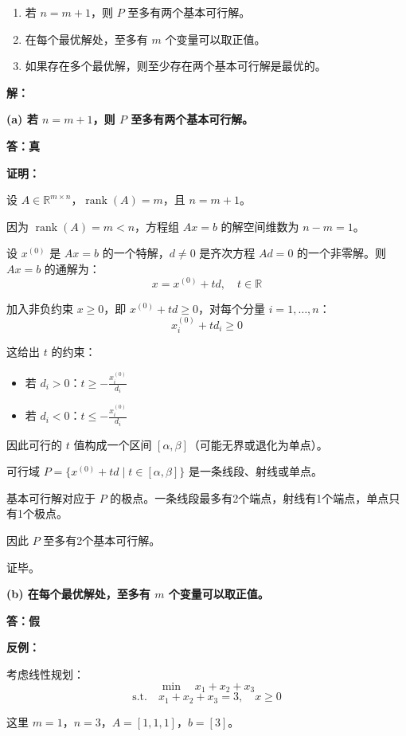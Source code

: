 \documentclass[12pt,a4paper]{article}
\begin{document}
\begin{enumerate}
    \item[(a)] 若 \( n = m + 1 \)，则 \( P \) 至多有两个基本可行解。
    \item[(b)] 在每个最优解处，至多有 \( m \) 个变量可以取正值。
    \item[(c)] 如果存在多个最优解，则至少存在两个基本可行解是最优的。
\end{enumerate}

\textbf{解：}

\textbf{(a) 若 $n = m + 1$，则 $P$ 至多有两个基本可行解。}

\textbf{答：真}

\textbf{证明：}

设 $A \in \mathbb{R}^{m \times n}$，$\operatorname{rank}(A) = m$，且 $n = m + 1$。

因为 $\operatorname{rank}(A) = m < n$，方程组 $Ax = b$ 的解空间维数为 $n - m = 1$。

设 $x^{(0)}$ 是 $Ax = b$ 的一个特解，$d \neq 0$ 是齐次方程 $Ad = 0$ 的一个非零解。则 $Ax = b$ 的通解为：
\[
x = x^{(0)} + td, \quad t \in \mathbb{R}
\]

加入非负约束 $x \geq 0$，即 $x^{(0)} + td \geq 0$，对每个分量 $i = 1, \ldots, n$：
\[
x^{(0)}_i + td_i \geq 0
\]

这给出 $t$ 的约束：
\begin{itemize}
    \item 若 $d_i > 0$：$t \geq -\frac{x^{(0)}_i}{d_i}$
    \item 若 $d_i < 0$：$t \leq -\frac{x^{(0)}_i}{d_i}$
\end{itemize}

因此可行的 $t$ 值构成一个区间 $[\alpha, \beta]$（可能无界或退化为单点）。

可行域 $P = \{x^{(0)} + td \mid t \in [\alpha, \beta]\}$ 是一条线段、射线或单点。

基本可行解对应于 $P$ 的极点。一条线段最多有2个端点，射线有1个端点，单点只有1个极点。

因此 $P$ 至多有2个基本可行解。

证毕。

\textbf{(b) 在每个最优解处，至多有 $m$ 个变量可以取正值。}

\textbf{答：假}

\textbf{反例：}

考虑线性规划：
\[
\min \quad x_1 + x_2 + x_3
\]
\[
\text{s.t.} \quad x_1 + x_2 + x_3 = 3, \quad x \geq 0
\]

这里 $m = 1$，$n = 3$，$A = [1, 1, 1]$，$b = [3]$。
\end{document}
